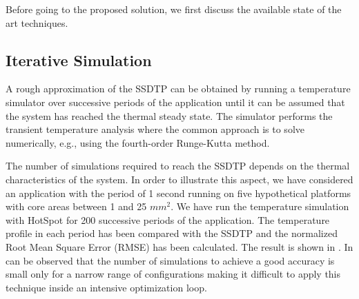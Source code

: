 Before going to the proposed solution, we first discuss the available state of the art techniques.

\subsection{Iterative Simulation}
A rough approximation of the SSDTP can be obtained by running a temperature simulator over successive periods of the application until it can be assumed that the system has reached the thermal steady state. The simulator performs the transient temperature analysis where the common approach is to solve  numerically, e.g., using the fourth-order Runge-Kutta method.

The number of simulations required to reach the SSDTP depends on the thermal characteristics of the system. In order to illustrate this aspect, we have considered an application with the period of 1 second running on five hypothetical platforms with core areas between 1 and 25 $mm^2$. We have run the temperature simulation with HotSpot \cite{huang2006} for 200 successive periods of the application. The temperature profile in each period has been compared with the SSDTP and the normalized Root Mean Square Error (RMSE) has been calculated. The result is shown in . In can be observed that the number of simulations to achieve a good accuracy is small only for a narrow range of configurations making it difficult to apply this technique inside an intensive optimization loop.

